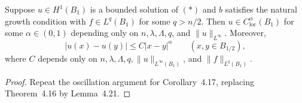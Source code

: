 \begin{corollary}\label{hanlin:weaksol-part2-nonlinear-holder}
Suppose $u\in H^1(B_1)$ is a bounded solution of $(\ast)$ and $b$ satisfies
the natural growth condition with $f\in L^q(B_1)$ for some $q>n/2$.
Then $u\in C^\alpha_{\mathrm{loc}}(B_1)$ for some $\alpha\in(0,1)$
depending only on $n,\lambda,\Lambda,q$, and $\|u\|_{L^\infty}$. Moreover,
\[
|u(x)-u(y)|\leq C|x-y|^\alpha
\qquad(x,y\in B_{1/2}),
\]
where $C$ depends only on
$n,\lambda,\Lambda,q,\|u\|_{L^\infty(B_1)}$, and
$\|f\|_{L^q(B_1)}$.
\end{corollary}
\begin{proof}
\sketch Repeat the oscillation argument for Corollary~4.17, replacing
Theorem~4.16 by Lemma~4.21.
\end{proof}

